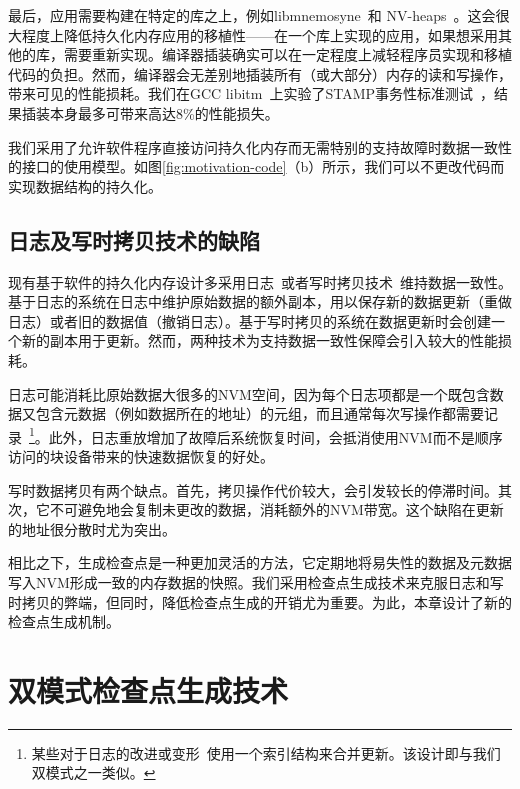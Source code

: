 最后，应用需要构建在特定的库之上，例如libmnemosyne~\cite{Volos:2011:MLP:1950365.1950379}和
NV-heaps~\cite{Coburn:2011:NMP:1950365.1950380}。这会很大程度上降低持久化内存应用的移植性——在一个库上实现的应用，如果想采用其他的库，需要重新实现。编译器插装确实可以在一定程度上减轻程序员实现和移植代码的负担。然而，编译器会无差别地插装所有（或大部分）内存的读和写操作，带来可见的性能损耗。我们在GCC libitm~\cite{libitm}上实验了STAMP事务性标准测试~\cite{Cao:2008:STA}，结果插装本身最多可带来高达8\%的性能损失。

我们采用了允许软件程序直接访问持久化内存而无需特别的支持故障时数据一致性的接口的使用模型。如图\ref{fig:motivation-code}（b）所示，我们可以不更改代码而实现数据结构的持久化。

\subsection{日志及写时拷贝技术的缺陷}

现有基于软件的持久化内存设计多采用日志~\cite{Volos:2011:MLP:1950365.1950379, Coburn:2011:NMP:1950365.1950380}或者写时拷贝技术~\cite{Condit:2009:BIT:1629575.1629589,
Venkataraman:2011:CDD:1960475.1960480}维持数据一致性。基于日志的系统在日志中维护原始数据的额外副本，用以保存新的数据更新（重做日志）或者旧的数据值（撤销日志）。基于写时拷贝的系统在数据更新时会创建一个新的副本用于更新。然而，两种技术为支持数据一致性保障会引入较大的性能损耗。

日志可能消耗比原始数据大很多的NVM空间，因为每个日志项都是一个既包含数据又包含元数据（例如数据所在的地址）的元组，而且通常每次写操作都需要记录~\cite{Volos:2011:MLP:1950365.1950379,
Coburn:2011:NMP:1950365.1950380}\footnote{某些对于日志的改进或变形~\cite{1003568}使用一个索引结构来合并更新。该设计即与我们双模式之一类似。}。此外，日志重放增加了故障后系统恢复时间，会抵消使用NVM而不是顺序访问的块设备带来的快速数据恢复的好处。

写时数据拷贝有两个缺点。首先，拷贝操作代价较大，会引发较长的停滞时间。其次，它不可避免地会复制未更改的数据，消耗额外的NVM带宽。这个缺陷在更新的地址很分散时尤为突出。

相比之下，生成检查点是一种更加灵活的方法，它定期地将易失性的数据及元数据写入NVM形成一致的内存数据的快照。我们采用检查点生成技术来克服日志和写时拷贝的弊端，但同时，降低检查点生成的开销尤为重要。为此，本章设计了新的检查点生成机制。


\section{双模式检查点生成技术}

